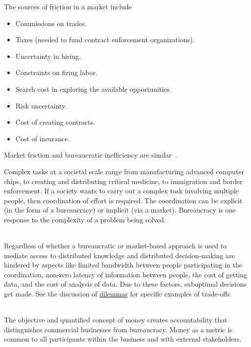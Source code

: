 The sources of friction in a market include
\begin{itemize}
    \item Commissions on trades.
    \item Taxes (needed to fund contract enforcement organizations).
    \item Uncertainty in hiring.
    \item Constraints on firing labor.
    \item Search cost in exploring the available opportunities.
    \item Risk uncertainty.
    \item Cost of creating contracts.
    \item Cost of insurance.
\end{itemize}
Market friction and bureaucratic inefficiency are similar~\cite{1937_Coase, 2010_economist}.


Complex tasks at a societal scale range from manufacturing advanced computer chips, to creating and distributing critical medicine, to immigration and border enforcement. 
If a society wants to carry out a complex task involving multiple people, then coordination of effort is required. The coordination can be explicit (in the form of a bureaucracy) or implicit (via a market).  Bureaucracy is one response to the complexity of a problem being solved.


\ \\

Regardless of whether a bureaucratic or market-based approach is used to mediate access to \iftoggle{glossarysubstitutionworks}{\glspl{shared resource}, }{shared resources, }%
distributed knowledge and distributed decision-making are hindered by aspects like
limited bandwidth between people participating in the coordination,
non-zero latency of information between people,
the cost of getting data,
and
the cost of analysis of data.
Due to these factors, suboptimal decisions get made. See  %
the discussion of 
\hyperref[sec:dilemma-trilemma]{dilemmas}
%
for specific examples of trade-offs.

\ \\

The objective and quantified concept of money creates accountability that distinguishes commercial businesses from bureaucracy. Money as a metric is common to all participants within the business and with external stakeholders. 

